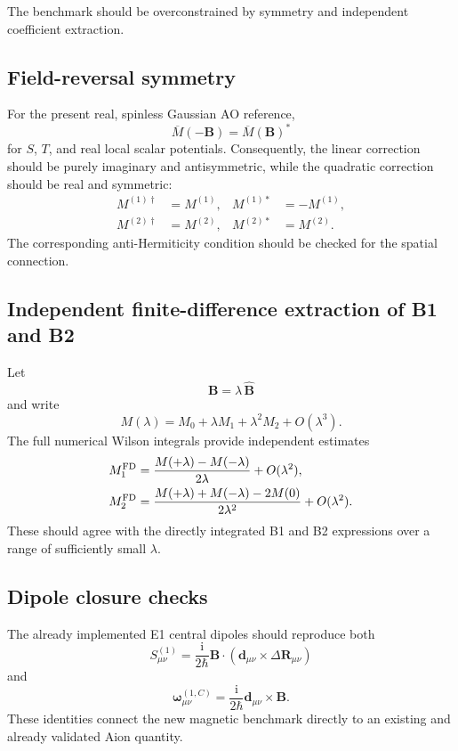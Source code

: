\documentclass[11pt]{article}
\newcommand{\ii}{\mathrm{i}}
\newcommand{\vect}[1]{\bm{#1}}
\begin{document}
The benchmark should be overconstrained by symmetry and independent coefficient extraction.

\subsection{Field-reversal symmetry}
For the present real, spinless Gaussian AO reference,
\begin{equation}
\overline M(-\vect B)=\overline M(\vect B)^*
\end{equation}
for $S$, $T$, and real local scalar potentials.  Consequently, the linear correction should be purely imaginary and antisymmetric, while the quadratic correction should be real and symmetric:
\begin{align}
M^{(1)\dagger}&=M^{(1)},
& M^{(1)*}&=-M^{(1)},\\
M^{(2)\dagger}&=M^{(2)},
& M^{(2)*}&=M^{(2)}.
\end{align}
The corresponding anti-Hermiticity condition should be checked for the spatial connection.

\subsection{Independent finite-difference extraction of B1 and B2}
Let
\begin{equation}
\vect B=\lambda\,\widehat{\vect B}
\end{equation}
and write
\begin{equation}
M(\lambda)=M_0+\lambda M_1+\lambda^2M_2+O(\lambda^3).
\end{equation}
The full numerical Wilson integrals provide independent estimates
\begin{align}
M_1^{\rm FD}
&=\frac{M(+\lambda)-M(-\lambda)}{2\lambda}+O(\lambda^2),\\
M_2^{\rm FD}
&=\frac{M(+\lambda)+M(-\lambda)-2M(0)}{2\lambda^2}+O(\lambda^2).
\end{align}
These should agree with the directly integrated B1 and B2 expressions over a range of sufficiently small $\lambda$.

\subsection{Dipole closure checks}
The already implemented E1 central dipoles should reproduce both
\begin{equation}
S^{(1)}_{\mu\nu}
=\frac{\ii}{2\hbar}\vect B\cdot
\left(\vect d_{\mu\nu}\times\Delta\vect R_{\mu\nu}\right)
\end{equation}
and
\begin{equation}
\vect\omega^{(1,C)}_{\mu\nu}
=\frac{\ii}{2\hbar}\vect d_{\mu\nu}\times\vect B.
\end{equation}
These identities connect the new magnetic benchmark directly to an existing and already validated Aion quantity.
\end{document}
